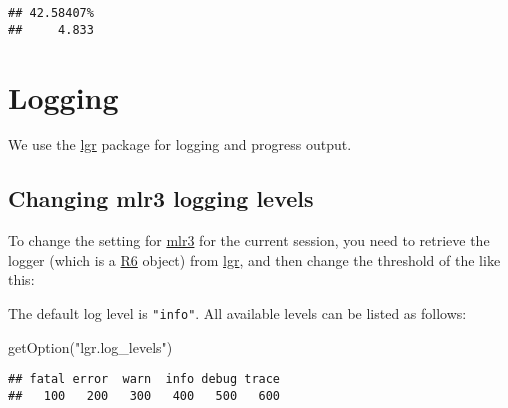\documentclass[
]{scrbook}
\newenvironment{Shaded}{\begin{snugshade}}{\end{snugshade}}
\newcommand{\FunctionTok}[1]{\textcolor[rgb]{0.00,0.00,0.00}{#1}}
\newcommand{\NormalTok}[1]{#1}
\newcommand{\OtherTok}[1]{\textcolor[rgb]{0.56,0.35,0.01}{#1}}
\newcommand{\SpecialCharTok}[1]{\textcolor[rgb]{0.00,0.00,0.00}{#1}}
\newcommand{\StringTok}[1]{\textcolor[rgb]{0.31,0.60,0.02}{#1}}
\renewenvironment{Shaded} {\begin{snugshade}\small} {\end{snugshade}}
\begin{document}
\begin{verbatim}
## 42.58407% 
##     4.833
\end{verbatim}

\hypertarget{logging}{%
\section{Logging}\label{logging}}

We use the \href{https://cran.r-project.org/package=lgr}{lgr} package for logging and progress output.

\hypertarget{changing-mlr3-logging-levels}{%
\subsection{Changing mlr3 logging levels}\label{changing-mlr3-logging-levels}}

To change the setting for \href{https://mlr3.mlr-org.com}{mlr3} for the current session, you need to retrieve the logger (which is a \href{https://cran.r-project.org/package=R6}{R6} object) from \href{https://cran.r-project.org/package=lgr}{lgr}, and then change the threshold of the like this:

\begin{Shaded}
\end{Shaded}

The default log level is \texttt{"info"}.
All available levels can be listed as follows:

\begin{Shaded}
\begin{Highlighting}[]
\FunctionTok{getOption}\NormalTok{(}\StringTok{"lgr.log\_levels"}\NormalTok{)}
\end{Highlighting}
\end{Shaded}

\begin{verbatim}
## fatal error  warn  info debug trace 
##   100   200   300   400   500   600
\end{verbatim}
\end{document}
